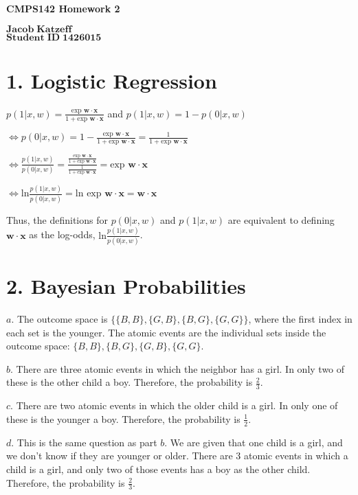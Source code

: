 \documentclass[11pt]{article}
\begin{document}
\begin{center}
{\bf\Large CMPS142 Homework 2}
\end{center}
\noindent $\mathbf{Jacob\;Katzeff}$\\
\noindent $\mathbf{Student\;ID\;1426015}$\\

\section*{1. Logistic Regression}

\noindent $p(1 | x,w)=\frac{\text{exp }\mathbf{w}\cdot \mathbf{x}}{1+\text{exp }\mathbf{w}\cdot \mathbf{x}}$ and $p(1 | x,w)=1-p(0|x,w)$

\noindent $\iff p(0 | x,w)=1-\frac{\text{exp }\mathbf{w}\cdot \mathbf{x}}{1+\text{exp }\mathbf{w}\cdot \mathbf{x}}=\frac{1}{1+\text{exp }\mathbf{w}\cdot \mathbf{x}}$

\noindent $\iff \frac{p(1 | x,w)}{p(0 | x,w)}=\frac{\frac{\text{exp }\mathbf{w}\cdot \mathbf{x}}{1+\text{exp }\mathbf{w}\cdot \mathbf{x}}}{\frac{1}{1+\text{exp }\mathbf{w}\cdot \mathbf{x}}}=\text{exp }\mathbf{w}\cdot\mathbf{x}$

\noindent $\iff \text{ln}\frac{p(1 | x,w)}{p(0 | x,w)}=\text{ln }\text{exp }\mathbf{w}\cdot\mathbf{x}=\mathbf{w}\cdot\mathbf{x}$

\noindent Thus, the definitions for $p(0 | x,w)$ and $p(1 | x,w)$ are equivalent to defining $\mathbf{w}\cdot\mathbf{x}$ as the log-odds, $\text{ln}\frac{p(1 | x,w)}{p(0 | x,w)}$.

\section*{2. Bayesian Probabilities}

\noindent $a.$ The outcome space is $\{\{B,B\},\{G,B\},\{B,G\},\{G,G\}\}$, where the first index in each set is the younger. The atomic events are the individual sets inside the outcome space: $\{B,B\}, \{B,G\},\{G,B\},\{G,G\}$.

\noindent $b.$ There are three atomic events in which the neighbor has a girl. In only two of these is the other child a boy. Therefore, the probability is $\frac{2}{3}$.

\noindent $c.$ There are two atomic events in which the older child is a girl. In only one of these is the younger a boy. Therefore, the probability is $\frac{1}{2}$.

\noindent $d.$ This is the same question as part $b$. We are given that one child is a girl, and we don't know if they are younger or older. There are 3 atomic events in which a child is a girl, and only two of those events has a boy as the other child. Therefore, the probability is $\frac{2}{3}$.
\end{document}
